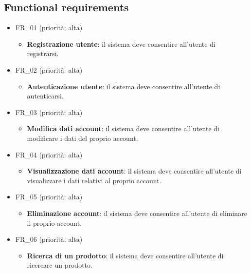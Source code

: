 \documentclass[12pt, a4paper, oneside]{book}
\begin{document}
    \subsection*{Functional requirements}
        \begin{itemize}
            \item FR\_01 (priorità: alta)
               \begin{itemize}
                   \item \textbf{Registrazione utente}: il sistema deve consentire all'utente di registrarsi.
                \end{itemize}
            \item FR\_02 (priorità: alta)
               \begin{itemize}
                   \item \textbf{Autenticazione utente}: il sistema deve consentire all'utente di autenticarsi.
                \end{itemize}
            \item FR\_03 (priorità: alta)
               \begin{itemize}
                   \item \textbf{Modifica dati account}: il sistema deve consentire all'utente di modificare i dati del proprio account.
                \end{itemize}
            \item FR\_04 (priorità: alta)
               \begin{itemize}
                   \item \textbf{Visualizzazione dati account}: il sistema deve consentire all'utente di visualizzare i dati relativi al proprio account.
                \end{itemize}
            \item FR\_05 (priorità: alta)
               \begin{itemize}
                   \item \textbf{Eliminazione account}: il sistema deve consentire all'utente di eliminare il proprio account.
                \end{itemize}
            \item FR\_06 (priorità: alta)
               \begin{itemize}
                   \item \textbf{Ricerca di un prodotto}: il sistema deve consentire all'utente di ricercare un prodotto.

\end{itemize}
\end{itemize}
\end{document}
